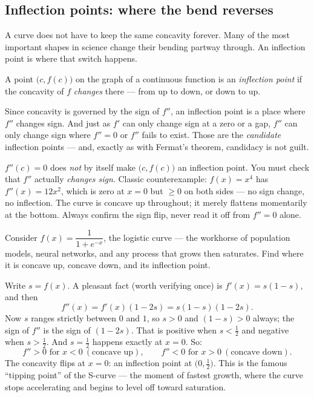 \subsection{Inflection points: where the bend reverses}

A curve does not have to keep the same concavity forever. Many of the most
important shapes in science change their bending partway through. An inflection
point is where that switch happens.

\begin{definition}\label{ch16:def-inflection}
A point $\big(c,f(c)\big)$ on the graph of a continuous function is an
\emph{inflection point} if the concavity of $f$ \emph{changes} there --- from up to
down, or down to up.
\end{definition}

Since concavity is governed by the sign of $f''$, an inflection point is a place
where $f''$ changes sign. And just as $f'$ can only change sign at a zero or a gap,
$f''$ can only change sign where $f''=0$ or $f''$ fails to exist. Those are the
\emph{candidate} inflection points --- and, exactly as with Fermat's theorem,
candidacy is not guilt.

\begin{trapbox}
$f''(c)=0$ does \emph{not} by itself make $\big(c,f(c)\big)$ an inflection point.
You must check that $f''$ actually \emph{changes sign}. Classic counterexample:
$f(x)=x^4$ has $f''(x)=12x^2$, which is zero at $x=0$ but $\ge 0$ on both sides ---
no sign change, no inflection. The curve is concave up throughout; it merely
flattens momentarily at the bottom. Always confirm the sign flip, never read it off
from $f''=0$ alone.
\end{trapbox}

\begin{example}\label{ch16:ex-logistic}
Consider $f(x)=\dfrac{1}{1+e^{-x}}$, the logistic curve --- the workhorse of
population models, neural networks, and any process that grows then saturates. Find
where it is concave up, concave down, and its inflection point.

\smallskip
Write $s=f(x)$. A pleasant fact (worth verifying once) is $f'(x)=s(1-s)$, and then
\[
f''(x)=f'(x)(1-2s)=s(1-s)(1-2s).
\]
Now $s$ ranges strictly between $0$ and $1$, so $s>0$ and $(1-s)>0$ always; the
sign of $f''$ is the sign of $(1-2s)$. That is positive when $s<\tfrac12$ and
negative when $s>\tfrac12$. And $s=\tfrac12$ happens exactly at $x=0$. So:
\[
f''>0 \text{ for } x<0 \ (\text{concave up}),\qquad
f''<0 \text{ for } x>0 \ (\text{concave down}).
\]
The concavity flips at $x=0$: an inflection point at $\big(0,\tfrac12\big)$. This
is the famous ``tipping point'' of the S-curve --- the moment of fastest growth,
where the curve stops accelerating and begins to level off toward saturation.
\end{example}

